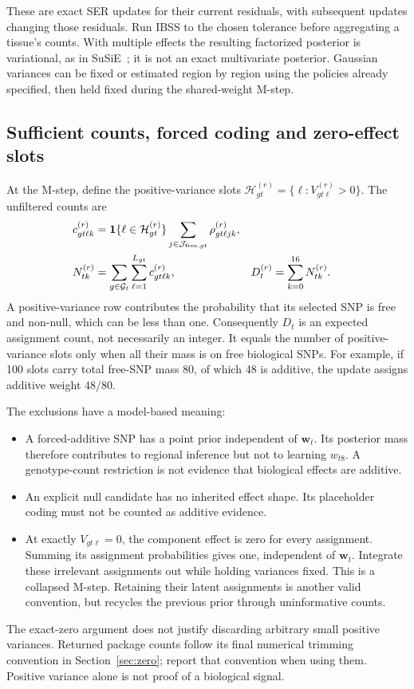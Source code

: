 \documentclass[11pt]{article}
\newcommand{\ind}{\mathbf 1}
\begin{document}
These are exact SER updates for their current residuals, with subsequent
updates changing those residuals. Run IBSS to the chosen tolerance before
aggregating a tissue's counts. With multiple effects the resulting
factorized posterior is variational, as in SuSiE~\cite{susie}; it is not an
exact multivariate posterior. Gaussian variances can be fixed or estimated
region by region using the policies already specified, then held fixed
during the shared-weight M-step.

\subsection{Sufficient counts, forced coding and zero-effect slots}
At the M-step, define the positive-variance slots
$\mathcal H_{gt}^{(r)}=\{\ell:V_{gt\ell}^{(r)}>0\}$. The unfiltered counts are
\begin{align}
 c_{gt\ell k}^{(r)}
 &=\ind\{\ell\in\mathcal H_{gt}^{(r)}\}
   \sum_{j\in\mathcal J_{{\rm free},gt}}\rho_{gt\ell jk}^{(r)},\nonumber\\
 N_{tk}^{(r)}
 &=\sum_{g\in\mathcal G_t}\sum_{\ell=1}^{L_{gt}}c_{gt\ell k}^{(r)},&
 D_t^{(r)}&=\sum_{k=0}^{16}N_{tk}^{(r)}.
 \label{eq:tissue-counts}
\end{align}
A positive-variance row contributes the probability that its selected SNP
is free and non-null, which can be less than one. Consequently $D_t$ is
an expected assignment count, not necessarily an integer. It equals the
number of positive-variance slots only when all their mass is on free
biological SNPs. For example, if 100 slots carry total free-SNP mass 80,
of which 48 is additive, the update assigns additive weight $48/80$.

The exclusions have a model-based meaning:
\begin{itemize}
 \item A forced-additive SNP has a point prior independent of $\mathbf w_t$.
 Its posterior mass therefore contributes to regional inference but not
 to learning $w_{t8}$. A genotype-count restriction is not evidence that
 biological effects are additive.
 \item An explicit null candidate has no inherited effect shape. Its
 placeholder coding must not be counted as additive evidence.
 \item At exactly $V_{gt\ell}=0$, the component effect is zero for every
 assignment. Summing its assignment probabilities gives one, independent
 of $\mathbf w_t$. Integrate these irrelevant assignments out while holding
 variances fixed. This is a collapsed M-step. Retaining their latent
 assignments is another valid convention, but recycles the previous prior
 through uninformative counts.
\end{itemize}
The exact-zero argument does not justify discarding arbitrary small
positive variances. Returned package counts follow its final numerical
trimming convention in Section~\ref{sec:zero}; report that convention when
using them. Positive variance alone is not proof of a biological signal.
\end{document}
